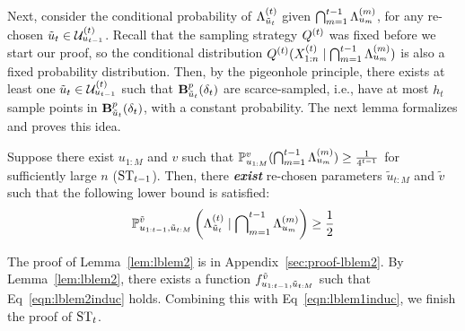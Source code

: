 Next, consider the conditional probability of $\Lambda_{\tilde u_{t}}^{({t})}$ given $\bigcap_{m=1}^{t-1} \Lambda_{u_{m}}^{({m})}$,
for any re-chosen $\tilde u_t \in \mathcal{U}^{({t})}_{u_{t-1}}$.
Recall that the sampling strategy $Q^{({t})}$ was fixed before we start our proof, 
so the conditional distribution $Q^{({t})}(X_{1:n}^{(t)} \mid \bigcap_{m=1}^{t-1} \Lambda_{u_{m}}^{({m})})$ 
is also a fixed probability distribution.
Then, by the pigeonhole principle, there exists at least one $\tilde u_t \in \mathcal{U}^{({t})}_{u_{t-1}}$ such that $\mathbf{B}^p_{\tilde u_t}({\delta_t})$ are scarce-sampled, i.e., have at most $h_t$ sample points in $\mathbf{B}^p_{\tilde u_t}({\delta_t})$, with a constant probability.
The next lemma formalizes and proves this idea.
\begin{lemma}
	\label{lem:lblem2}
	Suppose there exist $u_{1:M}$ and $v$ 
	such that $\mathbb{P}_{u_{1:M}}^v (\bigcap_{m=1}^{t-1} \Lambda_{u_{m}}^{({m})} ) \geq \frac{1}{4^{t-1}}$ for sufficiently large $n$ ($\textup{ST}_{t-1}$).
	Then, there \textbf{\emph{exist}} re-chosen parameters $\tilde u_{t:M}$ and $\tilde v$ such that 
	the following lower bound is satisfied:
	\begin{equation}
	\label{eqn:lblem2induc}
	\mathbb{P}_{u_{1:t-1}, \tilde u_{t:M}}^{\tilde v} \left (\Lambda_{\tilde u_{t}}^{({t})} \mid \bigcap\nolimits_{m=1}^{t-1} \Lambda_{u_{m}}^{({m})} \right ) \geq \frac{1}{2}
	\end{equation}
\end{lemma}
The proof of Lemma~\ref{lem:lblem2} is in Appendix~\ref{sec:proof-lblem2}.
By Lemma~\ref{lem:lblem2}, there exists a function $f_{u_{1:t-1}, \tilde u_{t:M}}^{\tilde v}$ such that Eq~\eqref{eqn:lblem2induc} holds. 
Combining this with Eq~\eqref{eqn:lblem1induc}, we finish the proof of $\textup{ST}_t$.

